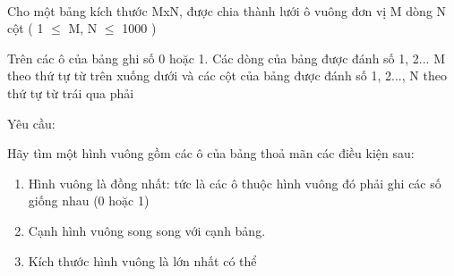  

Cho một bảng kích thước MxN, được chia thành lưới ô vuông đơn vị M dòng N cột ( 1  $\le$  M, N  $\le$  1000 )

Trên các ô của bảng ghi số 0 hoặc 1. Các dòng của bảng được đánh số 1, 2... M theo thứ tự từ trên xuống dưới và các cột của bảng được đánh số 1, 2..., N theo thứ tự từ trái qua phải

Yêu cầu:

Hãy tìm một hình vuông gồm các ô của bảng thoả mãn các điều kiện sau:
\begin{enumerate}
	\item Hình vuông là đồng nhất: tức là các ô thuộc hình vuông đó phải ghi các số giống nhau (0 hoặc 1)
	\item Cạnh hình vuông song song với cạnh bảng.
	\item Kích thước hình vuông là lớn nhất có thể
\end{enumerate}